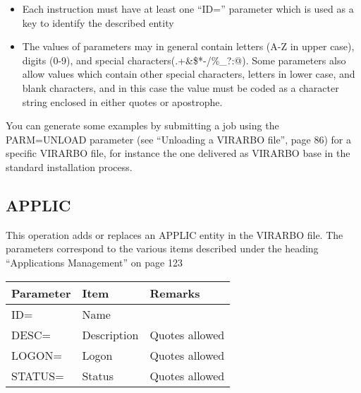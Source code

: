 \documentclass[letterpaper,10pt,english]{sphinxmanual}
\begin{document}
\begin{itemize}
\item {} 
Each instruction must have at least one “ID=” parameter which is used as a key to identify the described entity

\item {} 
The values of parameters may in general contain letters (A-Z in upper case), digits (0-9), and special characters(.+\&\$*-/\%\_?:@). Some parameters also allow values which contain other special characters, letters in lower case, and blank characters, and in this case the value must be coded as a character string enclosed in either quotes or apostrophe.

\end{itemize}

You can generate some examples by submitting a job using the PARM=UNLOAD parameter (see “Unloading a VIRARBO file”, page 86) for a specific VIRARBO file, for instance the one delivered as VIRARBO base in the standard installation process.

\ignorespaces 

\subsection{APPLIC}
\label{\detokenize{Installation_Guide:applic}}\label{\detokenize{Installation_Guide:index-160}}
This operation adds or replaces an APPLIC entity in the VIRARBO file. The parameters correspond to the various items
described under the heading “Applications Management” on page 123


\begin{savenotes}\sphinxattablestart
\centering
\begin{tabulary}{\linewidth}[t]{|T|T|T|}
\hline
\sphinxstyletheadfamily 
Parameter
&\sphinxstyletheadfamily 
Item
&\sphinxstyletheadfamily 
Remarks
\\
\hline
ID=
&
Name
&\\
\hline
DESC=
&
Description
&
Quotes allowed
\\
\hline
LOGON=
&
Logon
&
Quotes allowed
\\
\hline
STATUS=
&
Status
&
Quotes allowed
\\
\hline
\end{tabulary}
\par
\sphinxattableend\end{savenotes}
\end{document}
